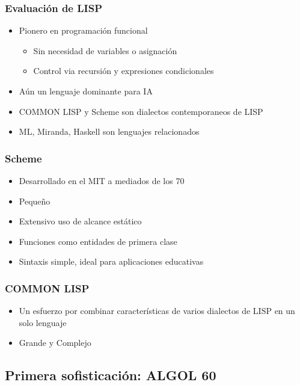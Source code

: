 \documentclass[11pt]{article}
\begin{document}
\subsubsection*{Evaluación de LISP}
\label{sec:orgheadline51}
\begin{itemize}
\item Pionero en programación funcional
\begin{itemize}
\item Sin necesidad de variables o asignación
\item Control via recursión y expresiones condicionales
\end{itemize}
\item Aún un lenguaje dominante para IA
\item COMMON LISP y Scheme son dialectos contemporaneos de LISP
\item ML, Miranda, Haskell son lenguajes relacionados
\end{itemize}

\subsubsection*{Scheme}
\label{sec:orgheadline52}
\begin{itemize}
\item Desarrollado en el MIT a mediados de los 70
\item Pequeño
\item Extensivo uso de alcance estático
\item Funciones como entidades de primera clase
\item Sintaxis simple, ideal para aplicaciones educativas
\end{itemize}

\subsubsection*{COMMON LISP}
\label{sec:orgheadline53}
\begin{itemize}
\item Un esfuerzo por combinar características de varios dialectos de LISP
en un solo lenguaje
\item Grande y Complejo
\end{itemize}

\subsection*{Primera sofisticación: ALGOL 60}
\label{sec:orgheadline62}
\end{document}
